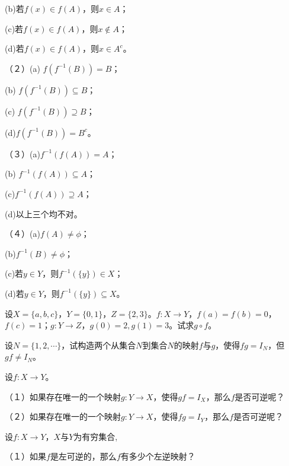 \documentclass{article}
\begin{document}
\begin{CJK}{UTF8}{gbsn}
\begin{Exercise}
  (b)若$f(x)\in f(A)$，则$x\in A$；

  (c)若$f(x)\in f(A)$，则$x\notin A$；

  (d)若$f(x)\in f(A)$，则$x\in A^c$。

  （２）(a) $f(f^{-1}(B))=B$；

  (b) $f(f^{-1}(B))\subseteq B$；

  (c) $f(f^{-1}(B))\supseteq B$；

  (d)$f(f^{-1}(B))= B^c$。

  （３）(a)$f^{-1}(f(A))=A$；

  (b) $f^{-1}(f(A))\subseteq A$；

  (c)$f^{-1}(f(A))\supseteq A$；

  (d)以上三个均不对。

  （４）(a)$f(A)\neq \phi$；

  (b)$f^{-1}(B) \neq \phi$；

  (c)若$y\in Y$，则$f^{-1}(\{y\})\in X$；

  (d)若$y\in Y$，则$f^{-1}(\{y\})\subseteq X$。
\end{Exercise}
\begin{Exercise}
  设$X=\{a,b,c\}$，$Y=\{0,1\}$，$Z=\{2,3\}$。$f:X\to Y$，$f(a)=f(b)=0$，$f(c)=1$；$g:Y\to Z$，$g(0)=2,g(1)=3$。试求$g\circ f$。
\end{Exercise}
\vspace{10cm}
\begin{Exercise}
  设$N=\{1,2,\cdots\}$，试构造两个从集合$N$到集合$N$的映射$f$与$g$，使得$fg=I_N$，但$gf\neq I_N$。
\end{Exercise}
\vspace{10cm}
\begin{Exercise}
设$f:X\to Y$。

（１）如果存在唯一的一个映射$g:Y\to X$，使得$gf=I_X$，那么$f$是否可逆呢？

（２）如果存在唯一的一个映射$g:Y\to X$，使得$fg=I_Y$，那么$f$是否可逆呢？
\end{Exercise}
\vspace{10cm}
\begin{Exercise}
设$f:X\to Y$，$X$与$Y$为有穷集合,

（１）如果$f$是左可逆的，那么$f$有多少个左逆映射？


\end{Exercise}
\end{CJK}
\end{document}

